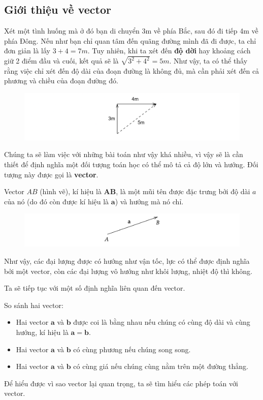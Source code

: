 \subsection{Giới thiệu về vector}
Xét một tình huống mà ở đó bạn di chuyển 3m về phía Bắc, sau đó đi tiếp 4m về phía Đông. Nếu như bạn chỉ quan tâm đến quãng đường mình đã đi được, ta chỉ đơn giản là lấy \(3+4=7\si{m}\). Tuy nhiên, khi ta xét đến \textbf{độ dời} hay khoảng cách giữ 2 điểm đầu và cuối, kết quả sẽ là \(\sqrt{3^2+4^2}=5\si{m}\). Như vậy, ta có thể thấy rằng việc chỉ xét đến độ dài của đoạn đường là không đủ, mà cần phải xét đến cả phương và chiều của đoạn đường đó.
\begin{figure}[H]
\centering
\includegraphics[width=1\textwidth]{Tuan2/Figures/gioithieuvector.png}
\end{figure}
Chúng ta sẽ làm việc với những bài toán như vậy khá nhiều, vì vậy sẽ là cần thiết để định nghĩa một đối tượng toán học có thể mô tả cả độ lớn và hướng. Đối tượng này được gọi là \textbf{vector}.
\begin{definition} Vector \(AB\) (hình vẽ), kí hiệu là \(\mathbf{AB}\), là một mũi tên được đặc trưng bởi độ dài \(a\) của nó (do đó còn được kí hiệu là \(\mathbf{a}\)) và hướng mà nó chỉ.
\end{definition}
\begin{figure}[H]
\centering
\includegraphics[width=1\textwidth]{Tuan2/Figures/vectorAB.png}
\end{figure}
Như vậy, các đại lượng được có hướng như vận tốc, lực có thể được định nghĩa bởi một vector, còn các đại lượng vô hướng như khôi lượng, nhiệt độ thì không.

Ta sẽ tiếp tục với một số định nghĩa liên quan đến vector.
\begin{definition}
    So sánh hai vector:
    \begin{itemize}
        \item Hai vector \(\mathbf{a}\) và \(\mathbf{b}\) được coi là bằng nhau nếu chúng có cùng độ dài và cùng hướng, kí hiệu là \(\mathbf{a}=\mathbf{b}\).
        \item Hai vector \(\mathbf{a}\) và \(\mathbf{b}\) có cùng phương nếu chúng song song.
        \item Hai vector \(\mathbf{a}\) và \(\mathbf{b}\) có cùng giá nếu chúng cùng nằm trên một đường thẳng.
    \end{itemize}
\end{definition}
Để hiểu được vì sao vector lại quan trọng, ta sẽ tìm hiểu các phép toán với vector.

